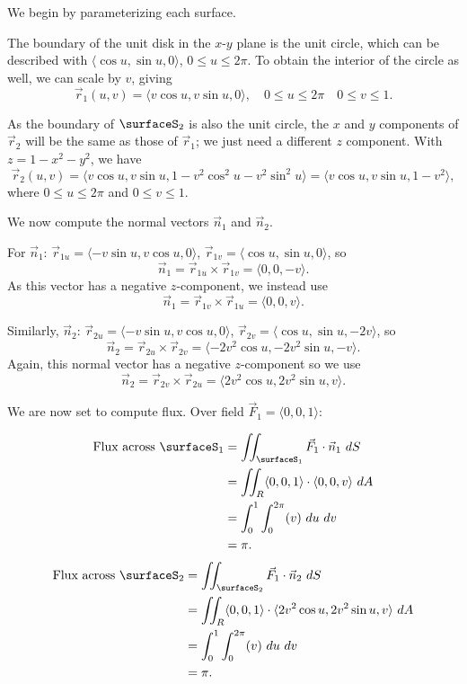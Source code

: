 {We begin by parameterizing each surface.

The boundary of the unit disk in the $x$-$y$ plane is the unit circle, which can be described with $\langle \cos u,\sin u,0\rangle$, $0\leq u\leq 2\pi$. To obtain the interior of the circle as well, we can scale by $v$, giving
\[
\vec r_1(u,v) = \langle v\cos u,v\sin u, 0\rangle, \quad 0\leq u\leq 2\pi\quad 0\leq v\leq 1.
\]

As the boundary of $\surfaceS_2$ is also the unit circle, the $x$ and $y$ components of $\vec r_2$ will be the same as those of $\vec r_1$; we just need a different $z$ component. With $z = 1-x^2-y^2$, we have
\[
\vec r_2(u,v) = \langle v\cos u,v\sin u, 1-v^2\cos^2u-v^2\sin^2u\rangle = \langle v\cos u,v\sin u, 1-v^2\rangle,
\]
where $0\leq u\leq 2\pi$ and $0\leq v\leq 1$.

We now compute the normal vectors $\vec n_1$ and $\vec n_2$.

For $\vec n_1$: $\vec r_{1u}= \langle -v\sin u, v\cos u,0\rangle$, $\vec r_{1v} = \langle \cos u,\sin u,0\rangle$, so
\[
\vec n_1 = \vec r_{1u}\times \vec r_{1v} = \langle 0,0,-v\rangle.
\]
As this vector has a negative $z$-component, we instead use
\[
\vec n_1 = \vec r_{1v}\times \vec r_{1u} = \langle 0,0,v\rangle.
\]

Similarly, $\vec n_2$: $\vec r_{2u}= \langle -v\sin u, v\cos u,0\rangle$, $\vec r_{2v} = \langle \cos u,\sin u,-2v\rangle$, so 
\[
\vec n_2 = \vec r_{2u}\times \vec r_{2v} = \langle -2v^2\cos u,-2v^2\sin u,-v\rangle.
\] 
Again, this normal vector has a negative $z$-component so we use
\[
\vec n_2 = \vec r_{2v}\times \vec r_{2u} = \langle 2v^2\cos u,2v^2\sin u,v\rangle.
\] 

We are now set to compute flux. Over field $\vec F_1=\langle 0,0,1\rangle$:

\begin{align*}
\text{Flux across $\surfaceS_1$} &= \iint_{\surfaceS_1} \vec F_1\cdot \vec n_1\ dS \\
						&= \iint_R\langle 0,0,1\rangle\cdot\langle 0,0,v\rangle\ dA\\
						&= \int_0^1\int_0^{2\pi} (v)\ du\ dv\\
						&= \pi.
\end{align*}
\drawexampleline%
\begin{align*}
\text{Flux across $\surfaceS_2$} &= \iint_{\surfaceS_2} \vec F_1\cdot \vec n_2\ dS \\
						&= \iint_R\langle 0,0,1\rangle\cdot\langle 2v^2\cos u,2v^2\sin u,v\rangle\ dA\\
						&= \int_0^1\int_0^{2\pi} (v)\ du\ dv\\
						&= \pi.
\end{align*}

}
